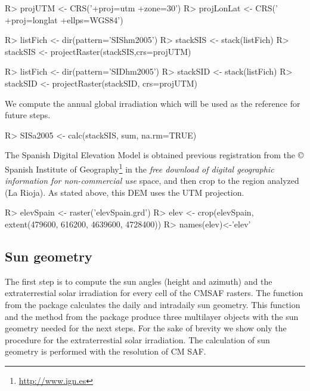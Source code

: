 \documentclass[article]{jss}
\begin{document}
\begin{CodeChunk}
\begin{CodeInput}
R> projUTM  <-  CRS('+proj=utm +zone=30')
R> projLonLat <- CRS(' +proj=longlat +ellps=WGS84')

R> listFich <- dir(pattern='SIShm2005')
R> stackSIS <- stack(listFich)
R> stackSIS <- projectRaster(stackSIS,crs=projUTM)

R> listFich <- dir(pattern='SIDhm2005')
R> stackSID <- stack(listFich)
R> stackSID <- projectRaster(stackSID, crs=projUTM)
\end{CodeInput}
\end{CodeChunk}

We compute the annual global irradiation which will be used as the
reference for future steps.
\begin{CodeChunk}
\begin{CodeInput}
R> SISa2005 <- calc(stackSIS, sum, na.rm=TRUE)
\end{CodeInput}
\end{CodeChunk}

The Spanish Digital Elevation Model is obtained previous registration from the \copyright
Spanish Institute of Geography\footnote{\url{http://www.ign.es}} in the \emph{free download of digital geographic information for non-commercial use} space, and then
crop to the region analyzed (La Rioja). As stated above, this DEM uses
the UTM projection.

\begin{CodeChunk}
\begin{CodeInput}
R> elevSpain <- raster('elevSpain.grd')
R> elev <- crop(elevSpain, extent(479600, 616200, 4639600, 4728400))
R> names(elev)<-'elev'
\end{CodeInput}
\end{CodeChunk}

\subsection{Sun geometry}
\label{sec-1-3}

The first step is to compute the sun angles (height and azimuth)
and the extraterrestial solar irradiation for every cell of the
CMSAF rasters. The function  from the 
package calculates the daily and intradaily sun geometry. This
function and the  method from the 
package produce three multilayer  objects with the
sun geometry needed for the next steps. For the sake of brevity we
show only the procedure for the extraterrestial solar
irradiation. The calculation of sun geometry is performed with the
resolution of CM SAF.
\end{document}
